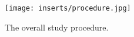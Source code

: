 \begin{figure}[!ht]
    \centering
    \texttt{[image: inserts/procedure.jpg]}
    \caption{The overall study procedure.}
    \label{fig:procedure}
\end{figure}
